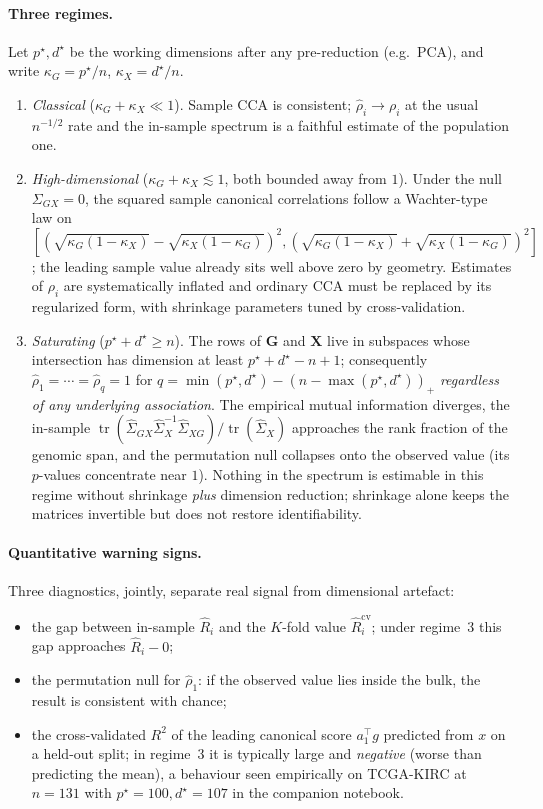 \documentclass{article}
\newcommand{\tr}{\operatorname{tr}}
\newcommand{\Sx}{\Sigma_{X}}
\newcommand{\Sgx}{\Sigma_{GX}}
\newcommand{\Sxg}{\Sigma_{XG}}
\newcommand{\T}{^{\top}}
\begin{document}
\paragraph{Three regimes.} Let $p^\star, d^\star$ be the working dimensions
after any pre-reduction (e.g.\ PCA), and write $\kappa_G = p^\star/n$,
$\kappa_X = d^\star/n$.
\begin{enumerate}
\item \emph{Classical} ($\kappa_G + \kappa_X \ll 1$). Sample CCA is consistent;
$\hat\rho_i \to \rho_i$ at the usual $n^{-1/2}$ rate and the in-sample spectrum
is a faithful estimate of the population one.
\item \emph{High-dimensional} ($\kappa_G + \kappa_X \lesssim 1$, both bounded
away from $1$). Under the null $\Sgx = 0$, the squared sample canonical
correlations follow a Wachter-type law on
$[(\sqrt{\kappa_G(1-\kappa_X)} - \sqrt{\kappa_X(1-\kappa_G)})^2,
 (\sqrt{\kappa_G(1-\kappa_X)} + \sqrt{\kappa_X(1-\kappa_G)})^2]$
\citep{wachter1980limiting,yang2015independence}; the leading sample value already sits well
above zero by geometry. Estimates of $\rho_i$ are systematically inflated and
ordinary CCA must be replaced by its regularized form, with shrinkage
parameters tuned by cross-validation.
\item \emph{Saturating} ($p^\star + d^\star \ge n$). The rows of $\mathbf{G}$
and $\mathbf{X}$ live in subspaces whose intersection has dimension at least
$p^\star + d^\star - n + 1$; consequently
$\hat\rho_1 = \cdots = \hat\rho_q = 1$ for $q = \min(p^\star, d^\star) - (n -
\max(p^\star, d^\star))_+$ \emph{regardless of any underlying association}.
The empirical mutual information diverges, the in-sample
$\tr(\hat\Sgx \hat\Sx^{-1} \hat\Sxg)/\tr(\hat\Sx)$ approaches the rank fraction
of the genomic span, and the permutation null collapses onto the observed
value (its $p$-values concentrate near $1$). Nothing in the spectrum is
estimable in this regime without shrinkage \emph{plus} dimension reduction;
shrinkage alone keeps the matrices invertible but does not restore
identifiability.
\end{enumerate}

\paragraph{Quantitative warning signs.} Three diagnostics, jointly, separate
real signal from dimensional artefact:
\begin{itemize}
\item the gap between in-sample $\hat R_i$ and the $K$-fold value $\hat
R_i^{\mathrm{cv}}$; under regime~3 this gap approaches $\hat R_i - 0$;
\item the permutation null for $\hat\rho_1$: if the observed value lies inside
the bulk, the result is consistent with chance;
\item the cross-validated $R^2$ of the leading canonical score $a_1\T g$
predicted from $x$ on a held-out split; in regime~3 it is typically large and
\emph{negative} (worse than predicting the mean), a behaviour seen empirically
on TCGA-KIRC at $n=131$ with $p^\star = 100, d^\star = 107$ in the companion
notebook.
\end{itemize}
\end{document}
